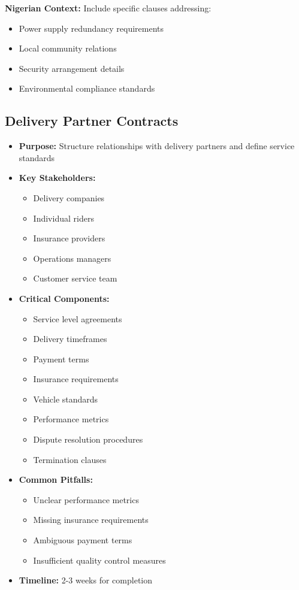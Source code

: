 \begin{tcolorbox}[colback=white,colframe=primarydark,title=\textbf{Warehouse Documentation}]
\textbf{Nigerian Context:}
Include specific clauses addressing:
\begin{itemize}
    \item Power supply redundancy requirements
    \item Local community relations
    \item Security arrangement details
    \item Environmental compliance standards
\end{itemize}
\end{tcolorbox}

\subsection{Delivery Partner Contracts}
\begin{tcolorbox}[colback=white,colframe=primarydark,title=\textbf{Delivery Network Documentation}]
\begin{itemize}
    \item \textbf{Purpose:} Structure relationships with delivery partners and define service standards
    \item \textbf{Key Stakeholders:}
    \begin{itemize}
        \item Delivery companies
        \item Individual riders
        \item Insurance providers
        \item Operations managers
        \item Customer service team
    \end{itemize}
    \item \textbf{Critical Components:}
    \begin{itemize}
        \item Service level agreements
        \item Delivery timeframes
        \item Payment terms
        \item Insurance requirements
        \item Vehicle standards
        \item Performance metrics
        \item Dispute resolution procedures
        \item Termination clauses
    \end{itemize}
    \item \textbf{Common Pitfalls:}
    \begin{itemize}
        \item Unclear performance metrics
        \item Missing insurance requirements
        \item Ambiguous payment terms
        \item Insufficient quality control measures
    \end{itemize}
    \item \textbf{Timeline:} 2-3 weeks for completion
\end{itemize}


\end{tcolorbox}
